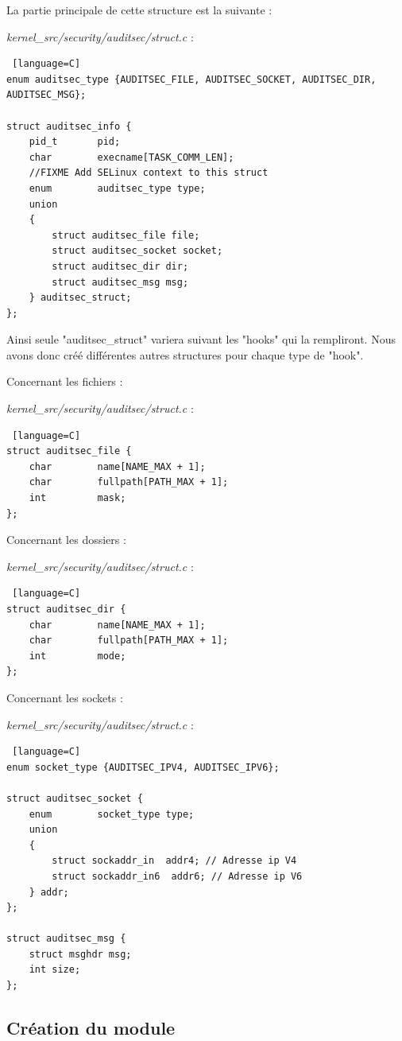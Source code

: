 \documentclass[pdftex,a4paper,titlepage,11pt]{article}
\begin{document}
La partie principale de cette structure est la suivante :

\textit{{kernel\_src}/security/auditsec/struct.c} :
\begin{lstlisting} [language=C]
enum auditsec_type {AUDITSEC_FILE, AUDITSEC_SOCKET, AUDITSEC_DIR, AUDITSEC_MSG};

struct auditsec_info {
    pid_t       pid;
    char        execname[TASK_COMM_LEN];
    //FIXME Add SELinux context to this struct
    enum        auditsec_type type;
    union
    {  
        struct auditsec_file file;
        struct auditsec_socket socket;
        struct auditsec_dir dir;
        struct auditsec_msg msg;
    } auditsec_struct;
};
\end{lstlisting} 

Ainsi seule "auditsec\_struct" variera suivant les "hooks" qui la rempliront. Nous avons donc créé différentes autres structures pour chaque type de "hook".

Concernant les fichiers :

\textit{{kernel\_src}/security/auditsec/struct.c} :
\begin{lstlisting} [language=C]
struct auditsec_file {
    char        name[NAME_MAX + 1];
    char        fullpath[PATH_MAX + 1];
    int         mask;
};
\end{lstlisting} 

Concernant les dossiers : 

\textit{{kernel\_src}/security/auditsec/struct.c} :
\begin{lstlisting} [language=C]
struct auditsec_dir {
    char        name[NAME_MAX + 1];
    char        fullpath[PATH_MAX + 1];
    int         mode;
};
\end{lstlisting} 

Concernant les sockets : 

\textit{{kernel\_src}/security/auditsec/struct.c} :
\begin{lstlisting} [language=C]
enum socket_type {AUDITSEC_IPV4, AUDITSEC_IPV6};

struct auditsec_socket {
    enum        socket_type type;
    union
    {
        struct sockaddr_in  addr4; // Adresse ip V4
        struct sockaddr_in6  addr6; // Adresse ip V6
    } addr;
};

struct auditsec_msg {
    struct msghdr msg;
    int size;
};
\end{lstlisting} 

\subsection{Création du module}
\end{document}
